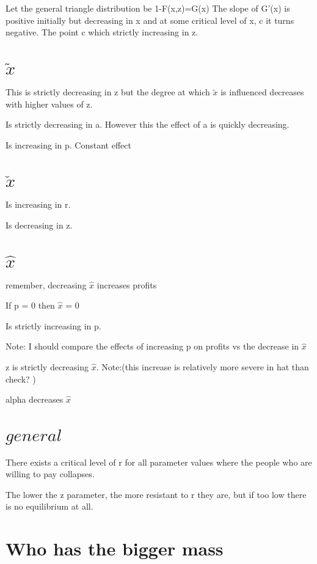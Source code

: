 \documentclass{article}
\begin{document}
Let the general triangle distribution be 
1-F(x,z)=G(x)
The slope of G'(x) is positive initially but decreasing in x and at some critical level of x, c it turns negative. The point c which strictly increasing in z. 

\section{$\tilde{x}$ }
This is strictly decreasing in z but the degree at which $\tilde{x}$ is influenced decreases with higher values of z.

Is strictly decreasing in a. However this the effect of a is quickly decreasing. 

Is increasing in p. Constant effect 

\section{$\check{x}$ }

Is increasing in r. 

Is decreasing in z. 

\section{$\hat{x}$ }

remember, decreasing $\hat{x}$ increases profits

If p = 0 then $\hat{x}$ = 0

Is strictly increasing in p. 

Note: I should compare the effects of increasing p on profits vs the decrease in $\hat{x}$

z is strictly decreasing $\hat{x}$. Note:(this increase is relatively more severe in hat than check? )

alpha decreases $\hat{x}$

\section{$general$ }

There exists a critical level of r for all parameter values where the people who are willing to pay collapses. 

The lower the z parameter, the more resistant to r they are, but if too low there is no equilibrium at all. 

\section{Who has the bigger mass}
\end{document}
